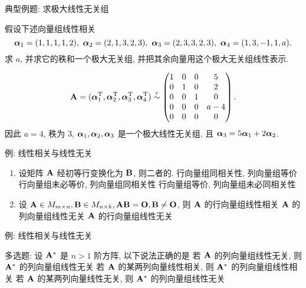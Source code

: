 \begin{frame}{典型例题: 求极大线性无关组}
	\onslide<+->
	\begin{exercise}
		假设下述向量组线性相关
		\[\bma_1=(1,1,1,1,2),\ 
		\bma_2=(2,1,3,2,3),\ 
		\bma_3=(2,3,3,2,3),\ 
		\bma_4=(1,3,-1,1,a).\]
		求 $a$, 并求它的秩和一个极大无关组, 并把其余向量用这个极大无关组线性表示.
	\end{exercise}
	\onslide<+->
	\begin{answer}
		\[{\mathbf{A}}=({\boldsymbol{\alpha}}_1^{\mathrm{T}},{\boldsymbol{\alpha}}_2^{\mathrm{T}},{\boldsymbol{\alpha}}_3^{\mathrm{T}},{\boldsymbol{\alpha}}_4^{\mathrm{T}})
		\mathrel{\overset{r}{\sim}}\begin{pmatrix}
			1&0&0&5\\
			0&1&0&2\\
			0&0&1&0\\
			0&0&0&a-4\\
			0&0&0&0
		\end{pmatrix}.\]
		因此 $a=4$, 秩为 $3$, ${\boldsymbol{\alpha}}_1,{\boldsymbol{\alpha}}_2,{\boldsymbol{\alpha}}_3$ 是一个极大线性无关组, 且 ${\boldsymbol{\alpha}}_3=5{\boldsymbol{\alpha}}_1+2{\boldsymbol{\alpha}}_2$.
	\end{answer}
\end{frame}


\begin{frame}{例: 线性相关与线性无关}
	\onslide<+->
	\begin{exercise}
		\begin{enumerate}
			\item 设矩阵 ${\mathbf{A}}$ 经初等行变换化为 ${\mathbf{B}}$, 则二者的.
				{行向量组同相关性, 列向量组等价}%
				{行向量组未必等价, 列向量组同相关性}%
				{行向量组等价, 列向量组未必同相关性}
			\item 设 ${\mathbf{A}}\in M_{m\times n},{\mathbf{B}}\in M_{n\times k},{\mathbf{A}}{\mathbf{B}}={\mathbf{O}},{\mathbf{B}}\neq {\mathbf{O}}$, 则
				{${\mathbf{A}}$ 的行向量组线性相关}%
				{${\mathbf{A}}$ 的列向量组线性无关}%
				{${\mathbf{A}}$ 的行向量组线性无关}
		\end{enumerate}
	\end{exercise}
\end{frame}



\begin{frame}{例: 线性相关与线性无关}
	\onslide<+->
	\begin{exercise}
		多选题: 设 ${\mathbf{A}}^*$ 是 $n>1$ 阶方阵, 以下说法正确的是
			{若 ${\mathbf{A}}$ 的列向量组线性无关, 则 ${\mathbf{A}}^*$ 的列向量组线性无关}%
			{若 ${\mathbf{A}}$ 的某两列向量线性相关, 则 ${\mathbf{A}}^*$ 的列向量组线性相关}%
			{若 ${\mathbf{A}}$ 的某两列向量线性无关, 则 ${\mathbf{A}}^*$ 的列向量组线性无关}
	\end{exercise}
\end{frame}
